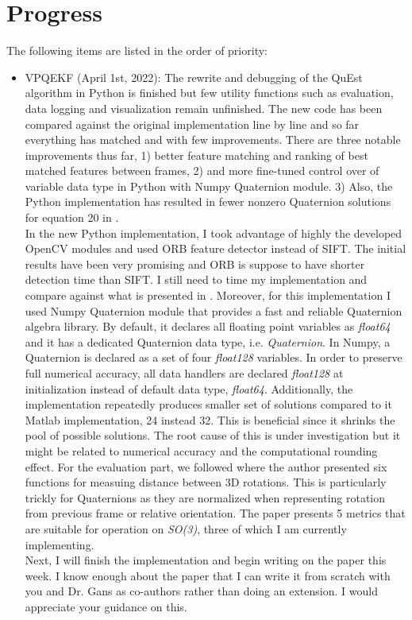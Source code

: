 \documentclass[11pt]{article}
\begin{document}
\section{Progress}
The following items are listed in the order of priority:
\begin{itemize}
    \item VPQEKF (April 1st, 2022): The rewrite and debugging of the QuEst
    algorithm in Python is finished but few utility functions such as
    evaluation, data logging and visualization remain unfinished. The new
    code has been compared against the original implementation line by line
    and so far everything has matched and with few improvements. There are
    three notable improvements thus far, 1) better feature matching and ranking
    of best matched features between frames, 2) and more fine-tuned control
    over of variable data type in Python with Numpy Quaternion module. 3) Also,
    the Python implementation has resulted in fewer nonzero Quaternion solutions
    for equation 20 in \cite{quest}.\\
    In the new Python implementation, I took advantage of highly the developed
    OpenCV modules and used ORB feature detector instead of SIFT. The initial
    results have been very promising and ORB is suppose to have shorter
    detection time than SIFT. I still need to time my implementation and
    compare against what is presented in \cite{quest}. Moreover, for this
    implementation I used Numpy Quaternion module that provides a fast and
    reliable Quaternion algebra library. By default, it declares all floating
    point variables as \emph{float64} and it has a dedicated Quaternion data
    type, i.e. \emph{Quaternion}. In Numpy, a Quaternion is declared as a set
    of four \emph{float128} variables. In order to preserve full numerical
    accuracy, all data handlers are declared \emph{float128} at initialization
    instead of default data type, \emph{float64}. Additionally, the
    implementation repeatedly produces smaller set of solutions compared to
    it Matlab implementation, 24 instead 32. This is beneficial since it shrinks
    the pool of possible solutions. The root cause of this is under
    investigation but it might be related to numerical accuracy and the
    computational rounding effect.
    For the evaluation part, we followed \cite{huynh2009metrics}
    where the author presented six functions for measuing distance between 3D
    rotations. This is particularly trickly for Quaternions as they are
    normalized when representing rotation from previous frame or relative
    orientation. The paper presents 5 metrics that are suitable for operation
    on \emph{SO(3)}, three of which I am currently implementing.\\
    Next, I will finish the implementation and begin writing on the paper this
    week. I know enough about the paper that I can write it from scratch with
    you and Dr. Gans as co-authors rather than doing an extension. I would
    appreciate your guidance on this.


\end{itemize}
\end{document}
